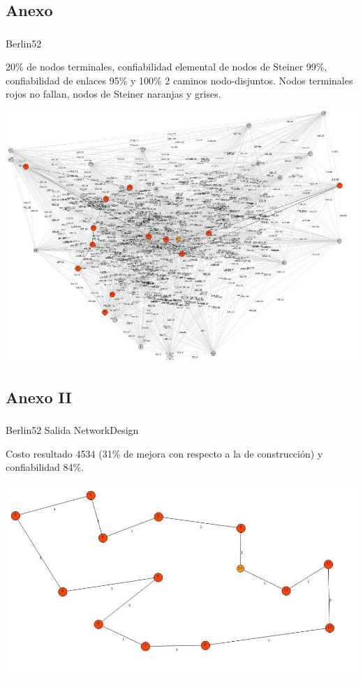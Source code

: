 \subsection{Anexo}
\begin{frame}\frametitle{}
\begin{block}{Berlin52}
\begin{scriptsize}
20\% de nodos terminales, confiabilidad elemental de nodos de Steiner 99\%, confiabilidad de enlaces 95\% y 100\% 2 caminos nodo-disjuntos.  Nodos terminales rojos no fallan, nodos de Steiner naranjas y grises.
\end{scriptsize}
\begin{center}
   \includegraphics[scale=0.35]{figuras/3}
\end{center}
\end{block}
\end{frame}

\subsection{Anexo II}
\begin{frame}\frametitle{}
\begin{block}{Berlin52 Salida NetworkDesign}
\begin{scriptsize}
Costo resultado 4534 (31\% de mejora con respecto a la de construcción) y confiabilidad 84\%.
\end{scriptsize}
\begin{center}
   \includegraphics[scale=0.35]{figuras/4}
\end{center}
\end{block}
\end{frame}